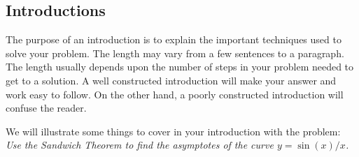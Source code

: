 %
%
%
%
% 
%


\subsection*{Introductions}

The purpose of  an introduction is to explain the important
techniques used to solve your problem. The length may vary from a few
sentences to a paragraph. The length usually depends upon the number
of steps in your problem needed to get to a solution. A well
constructed introduction will make your answer and work easy to
follow. On the other hand, a poorly constructed introduction will
confuse the reader.  


We will illustrate some things to cover in your introduction with the
problem:
{\em
Use the Sandwich Theorem to find the
      asymptotes of the curve $y= \sin(x)/x$.} 


